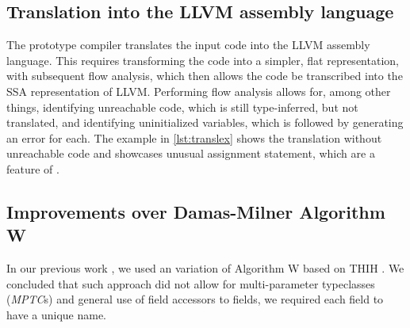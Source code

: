 \subsection{Translation into the LLVM assembly language}

The prototype compiler translates the input code into the LLVM assembly language. This requires transforming the code into a simpler, flat representation, with subsequent flow analysis, which then allows the code be transcribed into the SSA representation of LLVM. Performing flow analysis allows for, among other things, identifying unreachable code, which is still type-inferred, but not translated, and identifying uninitialized variables, which is followed by generating an error for each. The example in \cref{lst:translex} shows the translation without unreachable code and showcases unusual assignment statement, which are a feature of \cmm{}.

\subsection{Improvements over Damas-Milner Algorithm W}

In our previous work \cite{klepl2020type}, we used an variation of Algorithm W based on THIH \cite{jones1999typing}. We concluded that such approach did not allow for multi-parameter typeclasses (\emph{MPTC}s) and general use of field accessors to  fields, we required each field to have a unique name.

